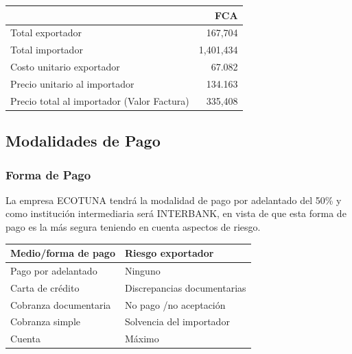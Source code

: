 \documentclass[
  stu,
  floatsintext,
  longtable,
  a4paper,
  nolmodern,
  notxfonts,
  notimes,
  12pt,
  colorlinks=true,linkcolor=blue,citecolor=blue,urlcolor=blue]{apa7}
\newcounter{none} %
\begin{document}
\begin{table}

{\caption{{Cotización FCA}{\label{tbl-cotizacion-fca}}}}

{\def\LTcaptype{none} %
\begin{longtable}[]{@{}lr@{}}
\toprule\noalign{}
& FCA \\
\midrule\noalign{}
\endhead
\bottomrule\noalign{}
\endlastfoot
Total exportador & 167,704 \\
Total importador & 1,401,434 \\
Costo unitario exportador & 67.082 \\
Precio unitario al importador & 134.163 \\
Precio total al importador (Valor Factura) & 335,408 \\
\end{longtable}
}

\end{table}

\subsection{Modalidades de Pago}\label{modalidades-de-pago}

\subsubsection{Forma de Pago}\label{forma-de-pago}

La empresa ECOTUNA tendrá la modalidad de pago por adelantado del 50\% y
como institución intermediaria será INTERBANK, en vista de que esta
forma de pago es la más segura teniendo en cuenta aspectos de riesgo.

\begin{table}

{\caption{{Evaluación de Riesgos por Modalidad de
Pago}{\label{tbl-riesgos-pago}}}}

{\def\LTcaptype{none} %
\begin{longtable}[]{@{}ll@{}}
\toprule\noalign{}
Medio/forma de pago & Riesgo exportador \\
\midrule\noalign{}
\endhead
\bottomrule\noalign{}
\endlastfoot
Pago por adelantado & Ninguno \\
Carta de crédito & Discrepancias documentarias \\
Cobranza documentaria & No pago /no aceptación \\
Cobranza simple & Solvencia del importador \\
Cuenta & Máximo \\
\end{longtable}
}

\end{table}
\end{document}

